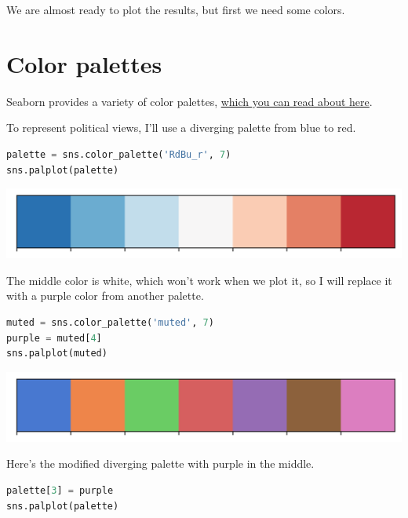 We are almost ready to plot the results, but first we need some colors.

\hypertarget{color-palettes}{%
\section{Color palettes}\label{color-palettes}}

Seaborn provides a variety of color palettes,
\href{https://seaborn.pydata.org/tutorial/color_palettes.html}{which you
can read about here}.

To represent political views, I'll use a diverging palette from blue to
red.

\begin{lstlisting}[language=Python,style=source]
palette = sns.color_palette('RdBu_r', 7)
sns.palplot(palette)
\end{lstlisting}

\begin{center}
\includegraphics[scale=0.75]{02_polviews_files/02_polviews_74_0.png}
\end{center}

The middle color is white, which won't work when we plot it, so I will
replace it with a purple color from another palette.

\begin{lstlisting}[language=Python,style=source]
muted = sns.color_palette('muted', 7)
purple = muted[4]
sns.palplot(muted)
\end{lstlisting}

\begin{center}
\includegraphics[scale=0.75]{02_polviews_files/02_polviews_76_0.png}
\end{center}

Here's the modified diverging palette with purple in the middle.

\begin{lstlisting}[language=Python,style=source]
palette[3] = purple
sns.palplot(palette)
\end{lstlisting}

